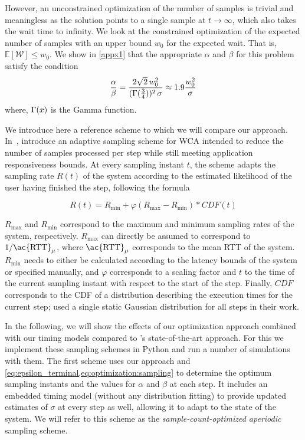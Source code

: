 However, an unconstrained optimization of the number of samples is trivial and meaningless as the solution points to a single sample at $t\!\rightarrow\!\infty$, which also takes the wait time to infinity.
We look at the constrained optimization of the expected number of samples with an upper bound $w_0$ for the expected wait.
That is, $\mathbb{E}[\mathcal{W}]\!\leq\!w_0$. We show in \cref{appx1} that the appropriate $\alpha$ and $\beta$ for this problem satisfy the condition
\begin{alignat}{1}\label{eq:optimization:sampling}
\frac{\alpha}{\beta}=\frac{2\sqrt{2}\,w_0^2}{(\mathlarger{\Gamma}(\tfrac{3}{4}))^2\,\sigma}\approx1.9\frac{w_0^2}{\sigma}
\end{alignat}
where, $\mathlarger{\Gamma}(x)$ is the Gamma function.

\medskip

We introduce here a reference scheme to which we will compare our approach.
In~\cite{Wang2019Towards}, \citeauthor{Wang2019Towards} introduce an adaptive sampling scheme for \ac{WCA} intended to reduce the number of samples processed per step while still meeting application responsiveness bounds.
At every sampling instant \( t \), the scheme adapts the sampling rate \( R(t) \) of the system according to the estimated likelihood of the user having finished the step,
following the formula 

\begin{equation}
    R(t) = R_\text{min} + \varphi\left( R_\text{max} - R_\text{min} \right) * CDF(t)
\end{equation}

\( R_\text{max} \) and \( R_\text{min} \) correspond to the maximum and minimum sampling rates of the system, respectively.
\( R_\text{max} \) can directly be assumed to correspond to \( 1 / \text{\ac{RTT}}_\mu \), where \( \text{\ac{RTT}}_\mu \) corresponds to the mean \ac{RTT} of the system.
\( R_\text{min} \) needs to either be calculated according to the latency bounds of the system or specified manually, and \( \varphi \) corresponds to a scaling factor and \( t \) to the time of the current sampling instant with respect to the start of the step.
Finally, \( CDF \) corresponds to the \ac{CDF} of a distribution describing the execution times for the current step; \citeauthor{Wang2019Towards} used a single static Gaussian distribution for all steps in their work.

\medskip

In the following, we will show the effects of our optimization approach combined with our timing models compared to \textcite{Wang2019Towards}'s state-of-the-art approach.
For this we implement these sampling schemes in Python and run a number of simulations with them.
The first scheme uses our approach and \cref{eq:epsilon_terminal,eq:optimization:sampling} to determine the optimum sampling instants and the values for \( \alpha \) and \( \beta \) at each step.
It includes an embedded timing model (without any distribution fitting) to provide updated estimates of \( \sigma \) at every step as well, allowing it to adapt to the state of the system.
We will refer to this scheme as the \emph{sample-count-optimized aperiodic} sampling scheme.

